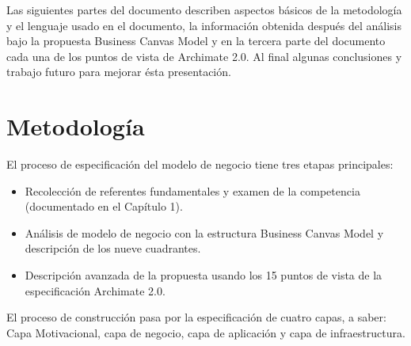 Las siguientes partes del documento describen aspectos básicos de la metodología y el lenguaje usado en el documento, la información obtenida después del análisis bajo la propuesta Business Canvas Model\cite{osterwalder2004business} y en la tercera parte del documento cada una de los puntos de vista de Archimate 2.0. Al final algunas conclusiones y trabajo futuro para mejorar ésta presentación. 


\section{Metodología}

El proceso de especificación del modelo de negocio tiene tres etapas principales:
\begin{itemize}
    \item Recolección de referentes fundamentales y examen de la competencia (documentado en el Capítulo 1).
    \item Análisis de modelo de negocio con la estructura Business Canvas Model \cite{osterwalder2004business} y descripción de los nueve cuadrantes.
    \item Descripción avanzada de la propuesta usando los 15 puntos de vista de la especificación Archimate 2.0.
\end{itemize}

El proceso de construcción pasa por la especificación de cuatro capas, a saber: Capa Motivacional, capa de negocio, capa de aplicación y capa de infraestructura.

